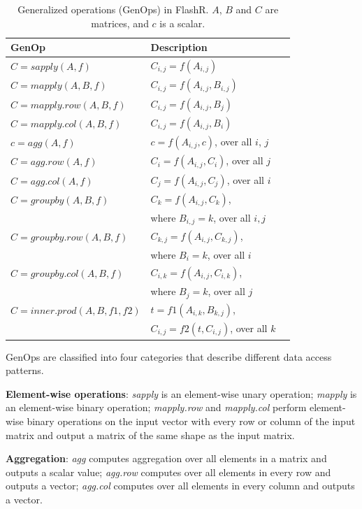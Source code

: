 \begin{table}
\begin{center}
\footnotesize
\begin{tabular}{|l|l|l|}
\hline
GenOp & Description \\
\hline
$C=sapply(A, f)$ & $C_{i,j}=f(A_{i,j})$ \\
\hline
$C=mapply(A, B, f)$ & $C_{i,j}=f(A_{i,j}, B_{i,j})$ \\
\hline
$C=mapply.row(A, B, f)$ & $C_{i,j}=f(A_{i,j}, B_j)$ \\
\hline
$C=mapply.col(A, B, f)$ & $C_{i,j}=f(A_{i,j}, B_i)$ \\
\hline
$c=agg(A, f)$ & $c=f(A_{i,j}, c)$, over all $i$, $j$ \\
\hline
$C=agg.row(A, f)$ & $C_i=f(A_{i,j}, C_i)$, over all $j$ \\
\hline
$C=agg.col(A, f)$ & $C_j=f(A_{i,j}, C_j)$, over all $i$ \\
\hline
$C=groupby(A, B, f)$ & $C_{k}=f(A_{i,j}, C_{k})$,\\ & where $B_{i, j}=k$, over all $i,j$ \\
\hline
$C=groupby.row(A, B, f)$ & $C_{k,j}=f(A_{i,j}, C_{k,j})$,\\ & where $B_i=k$, over all $i$ \\
\hline
$C=groupby.col(A, B, f)$ & $C_{i,k}=f(A_{i,j}, C_{i,k})$,\\ & where $B_j=k$, over all $j$ \\
\hline
$C=inner.prod(A, B, f1, f2)$ & $t=f1(A_{i,k}, B_{k,j})$,
\\ & $C_{i,j}=f2(t, C_{i,j})$, over all $k$ \\
\hline
\end{tabular}
\normalsize
\end{center}
\caption{Generalized operations (GenOps) in FlashR.
$A$, $B$ and $C$ are matrices, and $c$ is a scalar.}
\label{tbl:genops}
\end{table}

GenOps are classified into four categories that describe different data access
patterns.

\noindent \textbf{Element-wise operations}:
\textit{sapply} is an element-wise unary operation; \textit{mapply}
is an element-wise binary operation; \textit{mapply.row} and
\textit{mapply.col} perform element-wise binary operations on
the input vector with every row or column of the input matrix
and output a matrix of the same shape as the input matrix.

\noindent \textbf{Aggregation}: \textit{agg} computes aggregation over
all elements in a matrix and outputs a scalar value; \textit{agg.row}
computes over all elements in every row and outputs a vector;
\textit{agg.col} computes over all elements in every column and
outputs a vector.

